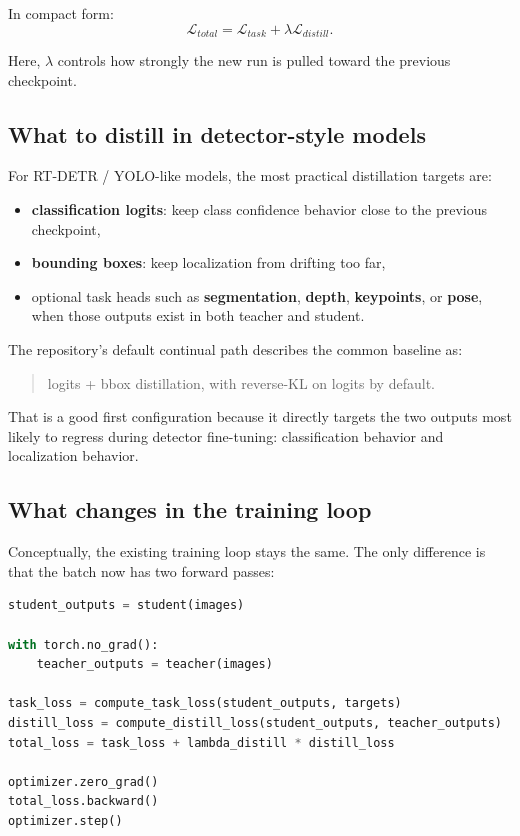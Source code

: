 In compact form:
\[
\mathcal{L}_{total} = \mathcal{L}_{task} + \lambda \mathcal{L}_{distill}.
\]

Here, $\lambda$ controls how strongly the new run is pulled toward the previous checkpoint.

\subsection{What to distill in detector-style models}

For RT-DETR / YOLO-like models, the most practical distillation targets are:
\begin{itemize}
  \item \textbf{classification logits}: keep class confidence behavior close to the previous checkpoint,
  \item \textbf{bounding boxes}: keep localization from drifting too far,
  \item optional task heads such as \textbf{segmentation}, \textbf{depth}, \textbf{keypoints}, or \textbf{pose}, when those outputs exist in both teacher and student.
\end{itemize}

The repository's default continual path describes the common baseline as:
\begin{quote}
logits + bbox distillation, with reverse-KL on logits by default.
\end{quote}

That is a good first configuration because it directly targets the two outputs most likely to regress during detector fine-tuning: classification behavior and localization behavior.

\subsection{What changes in the training loop}

Conceptually, the existing training loop stays the same.
The only difference is that the batch now has two forward passes:

\begin{lstlisting}[language=Python]
student_outputs = student(images)

with torch.no_grad():
    teacher_outputs = teacher(images)

task_loss = compute_task_loss(student_outputs, targets)
distill_loss = compute_distill_loss(student_outputs, teacher_outputs)
total_loss = task_loss + lambda_distill * distill_loss

optimizer.zero_grad()
total_loss.backward()
optimizer.step()
\end{lstlisting}

